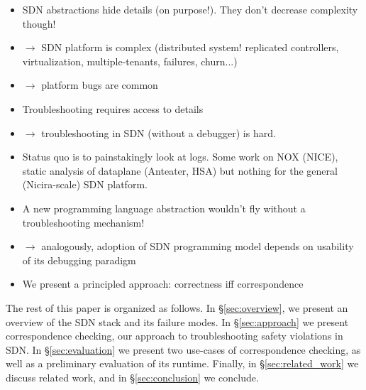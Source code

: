 \begin{itemize}
\item SDN abstractions hide details (on purpose!). They don't decrease
complexity though!
\item $\rightarrow$ SDN platform is complex (distributed system! replicated controllers,
virtualization, multiple-tenants, failures, churn...)
\item $\rightarrow$ platform bugs are common
\item Troubleshooting requires access to details
\item $\rightarrow$ troubleshooting in SDN (without a debugger) is hard.
\item Status quo is to painstakingly look at logs. Some work on NOX (NICE), static
analysis of dataplane (Anteater, HSA) but nothing for the general
(Nicira-scale) SDN platform.
\item A new programming language abstraction wouldn't fly without a troubleshooting
mechanism!
\item $\rightarrow$ analogously, adoption of SDN programming model depends on usability of its
debugging paradigm  
\item We present a principled approach: correctness iff correspondence 
\end{itemize}

The rest of this paper is organized as follows. In \S\ref{sec:overview},
we present an overview of the SDN stack and its failure modes.
In \S\ref{sec:approach} we present correspondence checking, our approach to
troubleshooting safety violations in SDN. In \S\ref{sec:evaluation} we present
two use-cases of correspondence checking, as well as a preliminary evaluation
of its runtime. Finally, in \S\ref{sec:related_work} we discuss related work,
and in \S\ref{sec:conclusion} we conclude.
